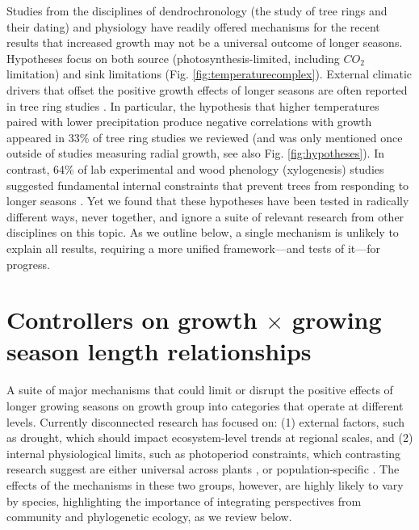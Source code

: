 \documentclass[11pt]{article}
\begin{document}
Studies from the disciplines of dendrochronology (the study of tree rings and their dating) and physiology have readily offered mechanisms for the recent results that increased growth may not be a universal outcome of longer seasons. Hypotheses focus on both source (photosynthesis-limited, including $CO_2$ limitation) and sink limitations (Fig. \ref{fig:temperaturecomplex}). External climatic drivers that offset the positive growth effects of longer seasons are often reported in tree ring studies \citep{kolavr2016response,de2022temperature,camarero2022decoupled}. In particular, the hypothesis that higher temperatures paired with lower precipitation produce negative correlations with growth appeared in 33\% of tree ring studies we reviewed (and was only mentioned once outside of studies measuring radial growth, see also Fig. \ref{fig:hypotheses}). In contrast, 64\% of lab experimental and wood phenology (xylogenesis) studies suggested fundamental internal constraints that prevent trees from responding to longer seasons \citep[Fig. \ref{fig:heatmapssupp},][]{cuny2012life,michelot2012comparing,zohner2023effect}. Yet we found that these hypotheses have been tested in radically different ways, never together, and ignore a suite of relevant research from other disciplines on this topic. As we outline below, a single mechanism is unlikely to explain all results, requiring a more unified framework---and tests of it---for progress. 
 
\section*{Controllers on growth $\times$ growing season length relationships}

A suite of major mechanisms that could limit or disrupt the positive effects of longer growing seasons on growth group into categories that operate at different levels. Currently disconnected research has focused on: (1) external factors, such as drought, which should impact ecosystem-level trends at regional scales, and (2) internal physiological limits, such as photoperiod constraints, which contrasting research suggest are either universal across plants \citep[e.g.,][]{zohner2023effect}, or population-specific \citep[e.g.,][]{soolanayakanahally2013timing}. The effects of the mechanisms in these two groups, however, are highly likely to vary by species, highlighting the importance of integrating perspectives from community and phylogenetic ecology, as we review below. 
\end{document}
